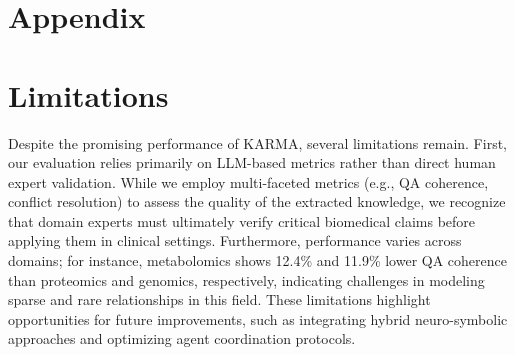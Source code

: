 \documentclass{article}
\begin{document}


%


\clearpage

\section*{Appendix}
\section{Limitations}
Despite the promising performance of KARMA, several limitations remain. First, our evaluation relies primarily on LLM-based metrics rather than direct human expert validation. While we employ multi-faceted metrics (e.g., QA coherence, conflict resolution) to assess the quality of the extracted knowledge, we recognize that domain experts must ultimately verify critical biomedical claims before applying them in clinical settings. Furthermore, performance varies across domains; for instance, metabolomics shows 12.4\% and 11.9\% lower QA coherence than proteomics and genomics, respectively, indicating challenges in modeling sparse and rare relationships in this field. These limitations highlight opportunities for future improvements, such as integrating hybrid neuro-symbolic approaches and optimizing agent coordination protocols.
\end{document}
